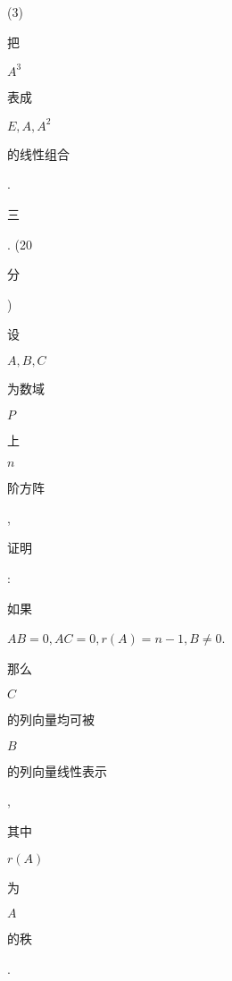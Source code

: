 \documentclass[10pt]{article}
\begin{document}
(3) \begin{CJK}{UTF8}{mj}把\end{CJK} $A^{3}$ \begin{CJK}{UTF8}{mj}表成\end{CJK} $E, A, A^{2}$ \begin{CJK}{UTF8}{mj}的线性组合\end{CJK}.

\begin{CJK}{UTF8}{mj}三\end{CJK}. (20 \begin{CJK}{UTF8}{mj}分\end{CJK}) \begin{CJK}{UTF8}{mj}设\end{CJK} $A, B, C$ \begin{CJK}{UTF8}{mj}为数域\end{CJK} $P$ \begin{CJK}{UTF8}{mj}上\end{CJK} $n$ \begin{CJK}{UTF8}{mj}阶方阵\end{CJK}, \begin{CJK}{UTF8}{mj}证明\end{CJK}: \begin{CJK}{UTF8}{mj}如果\end{CJK} $A B=0, A C=0, r(A)=n-1, B \neq 0$. \begin{CJK}{UTF8}{mj}那么\end{CJK} $C$ \begin{CJK}{UTF8}{mj}的列向量均可被\end{CJK} $B$ \begin{CJK}{UTF8}{mj}的列向量线性表示\end{CJK}, \begin{CJK}{UTF8}{mj}其中\end{CJK} $r(A)$ \begin{CJK}{UTF8}{mj}为\end{CJK} $A$ \begin{CJK}{UTF8}{mj}的秩\end{CJK}.
\end{document}
